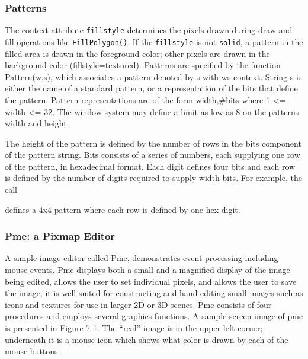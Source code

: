 \subsubsection{Patterns}

The context attribute \texttt{fillstyle} determines the
pixels drawn during draw and fill operations like \texttt{FillPolygon()}.
If the \texttt{fillstyle} is not \texttt{solid}, a pattern in
the filled area is drawn in the foreground color; other pixels are
drawn in the background color
({\textquotedbl}fillstyle=textured{\textquotedbl}). Patterns are
specified by the function Pattern(w,s), which associates a pattern
denoted by s with w{\textquotesingle}s context. String s is either
the name of a standard pattern, or a representation of the bits that
define the pattern. Pattern representations are of the form
{\textquotedbl}width,\#bits{\textquotedbl} where 1 {\textless}= width
{\textless}= 32. The window system may define a limit as low as 8 on
the pattern{\textquotesingle}s width and height.

The height of the pattern is defined by the number of rows in the bits
component of the pattern string. Bits consists of a series of
numbers, each supplying one row of the pattern, in hexadecimal format.
Each digit defines four bits and each row is defined by the number of
digits required to supply width bits. For example, the call


\noindent defines a 4x4 pattern where each row is defined by one hex digit.

\subsubsection{Pme: a Pixmap Editor}

A simple image editor called Pme, demonstrates event processing
including mouse events. Pme displays both a small and a
{\textquotedbl}magnified{\textquotedbl} display of the image being
edited, allows the user to set individual pixels, and allows the user
to save the image; it is well-suited for constructing and hand-editing
small images such as icons and textures for use in larger 2D or 3D
scenes. Pme consists of four procedures and employs several graphics
functions. A sample screen image of pme is presented in Figure 7-1. The
{\textquotedblleft}real{\textquotedblright} image is in the upper left
corner; underneath it is a mouse icon which shows what color is drawn
by each of the mouse buttons.



